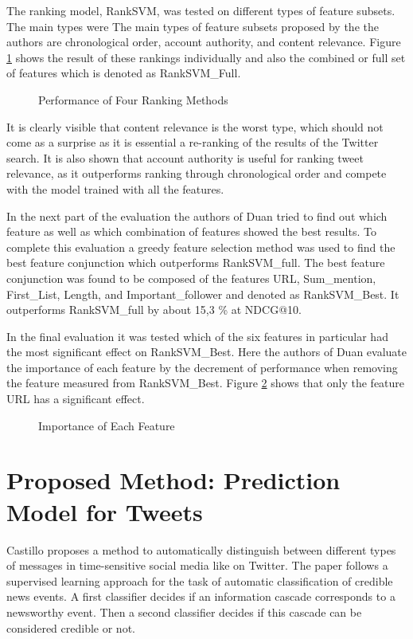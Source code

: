 \documentclass{proseminar}
\let\i\undefined
\newcommand{\i}[1]{\emph{#1}}
\begin{document}
The ranking model, RankSVM, was tested on different types of feature subsets. The main types were 
The main types of feature subsets proposed by the the authors are chronological order, account authority, and content relevance. Figure \ref{fig:ranking} shows the result of these rankings individually and also the combined or full set of features which is denoted as RankSVM\_Full.

\begin{figure}[h]
\centering
{}
\caption{Performance of Four Ranking Methods}
\label{fig:ranking}
\end{figure}

It is clearly visible that content relevance is the worst type, which should not come as a surprise as it is essential a re-ranking of the results of the Twitter search. It is also shown that account authority is useful for ranking tweet relevance, as it outperforms ranking through chronological order and compete with the model trained with all the features.

In the next part of the evaluation the authors of Duan \i{et al.} tried to find out which feature as well as which combination of features showed the best results.
To complete this evaluation a greedy feature selection method was used to find the best feature conjunction which outperforms RankSVM\_full. The best feature conjunction was found to be composed of the features URL, Sum\_mention, First\_List, Length, and Important\_follower and denoted as RankSVM\_Best. It outperforms RankSVM\_full by about 15,3 \% at NDCG@10.

In the final evaluation it was tested which of the six features in particular had the most significant effect on RankSVM\_Best. Here the authors of Duan \i{et al.} evaluate the importance of each feature by the decrement of performance when removing the feature measured from RankSVM\_Best. 
Figure \ref{fig:p2_resultFeature} shows that only the feature URL has a significant effect.

\begin{figure}[h]
\centering
{}
\caption{Importance of Each Feature}
\label{fig:p2_resultFeature}
\end{figure}



\section{Proposed Method: Prediction\\ Model for Tweets}
Castillo \i{et al.} proposes a method to automatically distinguish between different types of messages in time-sensitive social media like on Twitter.
The paper follows a supervised learning approach for the task of automatic classification of credible news events. A first classifier decides if an information cascade corresponds to a newsworthy event. Then a second classifier decides if this cascade can be considered credible or not.
\end{document}
